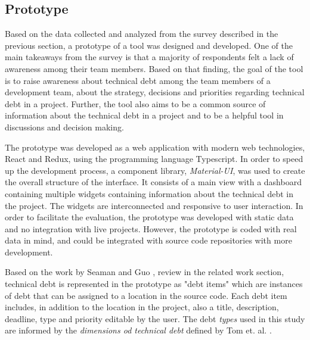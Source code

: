 \subsection{Prototype}
Based on the data collected and analyzed from the survey described in the previous section, a prototype of a tool was designed and developed.
One of the main takeaways from the survey is that a majority of respondents felt a lack of awareness among their team members.
Based on that finding, the goal of the tool is to raise awareness about technical debt among the team members of a development team, about the strategy, decisions and priorities regarding technical debt in a project.
Further, the tool also aims to be a common source of information about the technical debt in a project and to be a helpful tool in discussions and decision making.

The prototype was developed as a web application with modern web technologies, React and Redux, using the programming language Typescript.
In order to speed up the development process, a component library, \textit{Material-UI}, was used to create the overall structure of the interface.
It consists of a main view with a dashboard containing multiple widgets containing information about the technical debt in the project.
The widgets are interconnected and responsive to user interaction.
In order to facilitate the evaluation, the prototype was developed with static data and no integration with live projects.
However, the prototype is coded with real data in mind, and could be integrated with source code repositories with more development.

Based on the work by Seaman and Guo \cite{seaman_measuring_2011}, review in the related work section, technical debt is represented in the prototype as "debt items" which are instances of debt that can be assigned to a location in the source code.
Each debt item includes, in addition to the location in the project, also a title, description, deadline, type and priority editable by the user.
The debt \textit{types} used in this study are informed by the \textit{dimensions od technical debt} defined by Tom et. al. \cite{tom_exploration_2013}.




